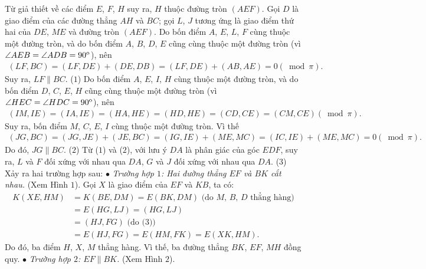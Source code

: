 \begin{multicols}{2}
	Từ giả thiết về các điểm $E$, $F$, $H$ suy ra, $H$ thuộc đường tròn $(AEF)$.
	\vskip 0.05cm
	Gọi $D$ là giao điểm của các đường thẳng $AH$ và $BC$; gọi $L$, $J$ tương ứng là giao điểm thứ hai của $DE$, $ME$ và đường tròn $(AEF)$.
	\vskip 0.05cm
	Do bốn điểm $A$, $E$, $L$, $F$ cùng thuộc một đường tròn, và do bốn điểm $A$, $B$, $D$, $E$ cũng cùng thuộc một đường tròn (vì $\angle AEB = \angle ADB = {90^{\rm{o}}}$), nên
	\begin{align*}
		\left( {LF,BC} \right) = \left( {LF,DE} \right) + \left( {DE,DB} \right) = \left( {LF,DE} \right) + \left( {AB,AE} \right) = 0\left( {\bmod \pi } \right).
	\end{align*}
	Suy ra, $LF \parallel BC$. \hfill ($1$)
	\vskip 0.05cm
	Do bốn điểm $A$, $E$, $I$, $H$ cùng thuộc một đường tròn, và do bốn điểm $D$, $C$, $E$, $H$ cũng cùng thuộc một đường tròn (vì $\angle HEC = \angle HDC = {90^{\rm{o}}}$), nên
	\begin{align*}
		\left( {IM,IE} \right) = \left( {IA,IE} \right) = \left( {HA,HE} \right) = \left( {HD,HE} \right) = \left( {CD,CE} \right) = \left( {CM,CE} \right)\left( {\bmod \pi } \right).
	\end{align*}
	Suy ra, bốn điểm $M$, $C$, $E$, $I$ cùng thuộc một đường tròn. Vì thế
	\begin{align*}
		\left( {JG,BC} \right) = \left( {JG,JE} \right) + \left( {JE,BC} \right) = \left( {IG,IE} \right) + \left( {ME,MC} \right) = \left( {IC,IE} \right) + \left( {ME,MC} \right) = 0\left( {\bmod \pi } \right).
	\end{align*}
	Do đó, $JG \parallel BC$. \hfill ($2$)
	\vskip 0.05cm
	Từ ($1$) và ($2$), với lưu ý $DA$ là phân giác của góc $EDF$, suy ra, $L$ và $F$ đối xứng với nhau qua $DA$, $G$ và $J$ đối xứng với nhau qua $DA$.  \hfill ($3$)
	\vskip 0.05cm
	Xảy ra hai trường hợp sau:
	\vskip 0.05cm
	$\bullet$ \textit{Trường hợp $1$: Hai đường thẳng $EF$ và $BK$ cắt nhau.} (Xem Hình $1$).
	\vskip 0.05cm
	Gọi $X$ là giao điểm của $EF$ và $KB$, ta có:
	\begin{align*}
		K(XE, HM) &= K(BE, DM) = E(BK, DM)  \text{ (do $M$, $B$, $D$ thẳng hàng)}\\
		&= E(HG, LJ) = (HG, LJ)\\
		&= (HJ, FG)  \text{ (do (3))}\\
		&= E(HJ, FG) = E(HM, FK) = E(XK, HM).
	\end{align*}
	Do đó, ba điểm $H$, $X$, $M$ thẳng hàng. Vì thế, ba đường thẳng $BK$, $EF$, $MH$ đồng quy.
	\vskip 0.05cm
	$\bullet$ \textit{Trường hợp $2$: $EF \parallel BK$.} (Xem Hình $2$).

\end{multicols}
